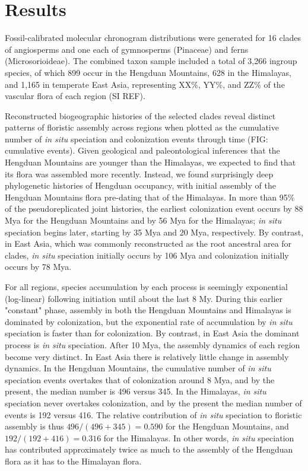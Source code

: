 \section{Results}

Fossil-calibrated molecular chronogram distributions were generated for 16 clades of angiosperms and one each of gymnosperms (Pinaceae) and ferns (Microsorioideae). The combined taxon sample included a total of 3,266 ingroup species, of which 899 occur in the Hengduan Mountains, 628 in the Himalayas, and 1,165 in temperate East Asia, representing XX\%, YY\%, and ZZ\% of the vascular flora of each region (SI REF).

Reconstructed biogeographic histories of the selected clades reveal distinct patterns of floristic assembly across regions when plotted as the cumulative number of \textit{in situ} speciation and colonization events through time (FIG: cumulative events). Given geological and paleontological inferences that the Hengduan Mountains are younger than the Himalayas, we expected to find that its flora was assembled more recently. Instead, we found surprisingly deep phylogenetic histories of Hengduan occupancy, with initial assembly of the Hengduan Mountains flora pre-dating that of the Himalayas. In more than 95\% of the pseudoreplicated joint histories, the earliest colonization event occurs by 88 Mya for the Hengduan Mountains and by 56 Mya for the Himalayas; \textit{in situ} speciation begins later, starting by 35 Mya and 20 Mya, respectively. By contrast, in East Asia, which was commonly reconstructed as the root ancestral area for clades, \textit{in situ} speciation initially occurs by 106 Mya and colonization initially occurs by 78 Mya.

For all regions, species accumulation by each process is seemingly exponential (log-linear) following initiation until about the last 8 My. During this earlier "constant" phase, assembly in both the Hengduan Mountains and Himalayas is dominated by colonization, but the exponential rate of accumulation by \textit{in situ} speciation is faster than for colonization. By contrast, in East Asia the dominant process is \textit{in situ} speciation.  After 10 Mya, the assembly dynamics of each region become very distinct. In East Asia there is relatively little change in assembly dynamics. In the Hengduan Mountains, the cumulative number of \textit{in situ} speciation events overtakes that of colonization around 8 Mya, and by the present, the median number is 496 versus 345. In the Himalayas, \textit{in situ} speciation never overtakes colonization, and by the present the median number of events is 192 versus 416. The relative contribution of \textit{in situ} speciation to floristic assembly is thus $496/(496+345) = 0.590$ for the Hengduan Mountains, and $192/(192+416) = 0.316$ for the Himalayas. In other words, \textit{in situ} speciation has contributed approximately twice as much to the assembly of the Hengduan flora as it has to the Himalayan flora.

